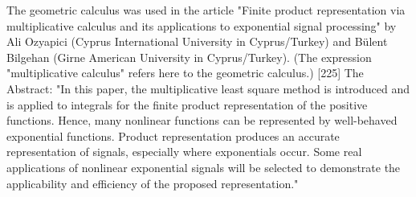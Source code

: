 \documentclass[12pt]{article}
\begin{document}
The geometric calculus was used in the article "Finite product representation via multiplicative calculus and its applications to exponential signal processing" by Ali Ozyapici (Cyprus International University in Cyprus/Turkey) and Bülent Bilgehan (Girne American University in Cyprus/Turkey). (The expression "multiplicative calculus" refers here to the geometric calculus.) [225] The Abstract: "In this paper, the multiplicative least square method is introduced and is applied to integrals for the finite product representation of the positive functions. Hence, many nonlinear functions can be represented by well-behaved exponential functions. Product representation produces an accurate representation of signals, especially where exponentials occur. Some real applications of nonlinear exponential signals will be selected to demonstrate the applicability and efficiency of the proposed representation."
\end{document}
